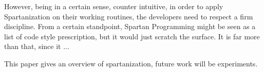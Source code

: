 
However, being in a certain sense, counter intuitive, in order to apply
Spartanization on their working routines, the developers need to respect a firm
discipline. From a certain standpoint, Spartan Programming might be seen as a
list of code style prescription, but it would just scratch the surface. It is
far more than that, since it ...

This paper gives an overview of spartanization, future work will be
experiments.

